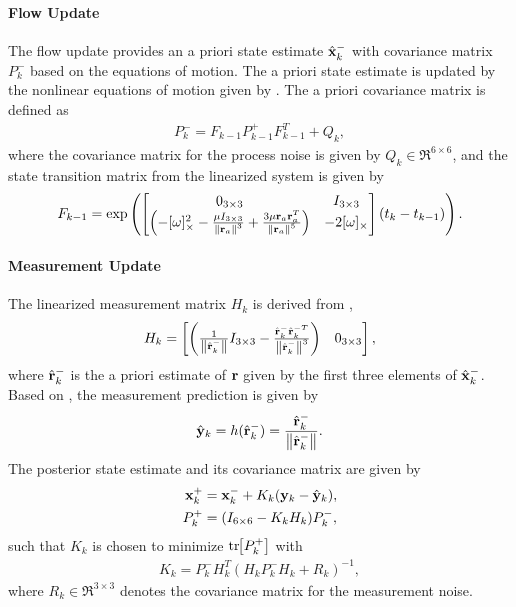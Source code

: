 \paragraph{Flow Update}
The flow update provides an a priori state estimate $\hat {\mathbf{x}}^-_k$ with covariance matrix $P^-_k$ based on the equations of motion. The a priori state estimate is updated by the nonlinear equations of motion given by . The a priori covariance matrix is defined as
\begin{align}
P^-_k=F_{k-1}P^+_{k-1}F_{k-1}^T+Q_k,
\end{align}
where the covariance matrix for the process noise is given by $Q_k\in\Re^{6\times 6}$, and the state transition matrix from the linearized system is given by
\begin{align}
F_{k-1}=\exp\left(
\begin{bmatrix}
0_{3\times3} & I_{3\times3} \\
\left(-[\omega]_\times^2-\frac{\mu I_{3\times3}}{\left\| \mathbf{r}_a \right\|^3}+\frac{3\mu \mathbf{r}_a \mathbf{r}_a^T}{\left\| \mathbf{r}_a \right\|^5}\right) & -2[\omega]_\times
\end{bmatrix}
(t_k-t_{k-1})\right).
\end{align}

\paragraph{Measurement Update}
The linearized measurement matrix $H_k$ is derived from ,
\begin{align}
H_k=
\begin{bmatrix}
\left(\frac1{\left\| \hat {\mathbf{r}}_{k}^- \right\|}I_{3\times3}-\frac{\hat {\mathbf{r}}_{k}^-{\hat {\mathbf{r}}_{k}^{-T}}}{\left\| \hat {\mathbf{r}}_{k}^- \right\|^3}\right) & 0_{3\times3}
\end{bmatrix},
\end{align}
where $\hat {\mathbf{r}}_{k}^-$ is the a priori estimate of $\mathbf{r}$ given by the first three elements of $\hat {\mathbf{x}}_{k}^-$.
Based on , the measurement prediction is given by
\begin{align}
\hat{\mathbf{y}}_k=h(\hat {\mathbf{r}}_{k}^-)=\frac{\hat {\mathbf{r}}_{k}^-}{\left\| \hat {\mathbf{r}}_{k}^- \right\|}.
\end{align}
The posterior state estimate and its covariance matrix are given by
\begin{align}
\mathbf{x}^+_k&=\mathbf{x}^-_k+K_k(\mathbf{y}_k-\hat{\mathbf{y}}_k),
\\
P^+_k&=(I_{6\times6}-K_kH_k)P^-_k,
\end{align}
such that $K_k$ is chosen to minimize $\mathrm{tr}\negthickspace\left[ P^+_k \right]$ with
\begin{align}
K_k=P^-_kH_k^T(H_kP^-_kH_k+R_k)^{-1},
\end{align}
where $R_k\in\Re^{3\times 3}$ denotes the covariance matrix for the measurement noise.


